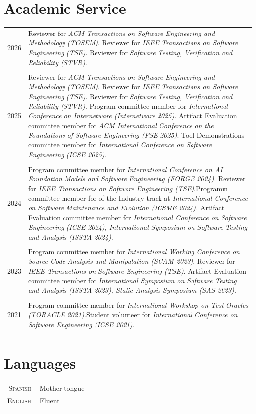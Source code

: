 \documentclass[a4paper,10pt]{article} %
\begin{document}
\section{Academic Service}

\begin{longtable}{>{\raggedleft\arraybackslash}p{} p{}}

\textsc{2026} & Reviewer for \textit{ACM Transactions on Software Engineering and Methodology (TOSEM)}. Reviewer for \textit{IEEE Transactions on Software Engineering (TSE)}. Reviewer for \textit{Software Testing, Verification and Reliability (STVR)}. \\ & \\

\textsc{2025} & Reviewer for \textit{ACM Transactions on Software Engineering and Methodology (TOSEM)}. Reviewer for \textit{IEEE Transactions on Software Engineering (TSE)}. Reviewer for \textit{Software Testing, Verification and Reliability (STVR)}.
Program committee member for \textit{International Conference on Internetware (Internetware 2025)}. Artifact Evaluation committee member for \textit{ACM International Conference on the Foundations of Software Engineering (FSE 2025)}.
Tool Demonstrations committee member for \textit{International Conference on Software Engineering (ICSE 2025).}
\\ & \\

\textsc{2024} & Program committee member for \textit{International Conference on AI Foundation Models and Software Engineering (FORGE 2024)}. Reviewer for \textit{IEEE Transactions on Software Engineering (TSE)}.Programm committee member for of the Industry track at \textit{International Conference on Software Maintenance and Evolution (ICSME 2024).} Artifact Evaluation committee member for \textit{International Conference on Software Engineering (ICSE 2024), International Symposium on Software Testing and Analysis (ISSTA 2024).} \\ & \\

\textsc{2023} & Program committee member for \textit{International Working Conference on Source Code Analysis and Manipulation (SCAM 2023)}. Reviewer for \textit{IEEE Transactions on Software Engineering (TSE)}. Artifact Evaluation committee member for \textit{International Symposium on Software Testing and Analysis (ISSTA 2023), Static Analysis Symposium (SAS 2023).} \\ & \\

\textsc{2021} & Program committee member for \textit{International Workshop on Test Oracles (TORACLE 2021)}.Student volunteer for \textit{International Conference on Software Engineering (ICSE 2021).} \\ & \\

\end{longtable}

\section{Languages}
\begin{tabular}{rl}
\\
\textsc{Spanish:} & Mother tongue\\
\textsc{English:} & Fluent \\ & \\
\end{tabular}
\end{document}
